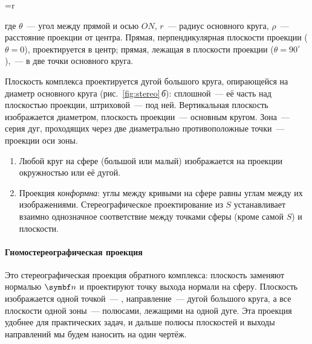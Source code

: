 \begin{keyeq}\label{eq:stereo-rho}
\rho=r\,\frac{}
\end{keyeq}
где $\theta$~— угол между прямой и осью $ON$, $r$~— радиус основного круга,
$\rho$~— расстояние проекции от центра. Прямая, перпендикулярная
плоскости проекции ($\theta=0$), проектируется в центр; прямая, лежащая в
плоскости проекции ($\theta=90^\circ$),~— в две точки основного круга.

Плоскость комплекса проектируется дугой большого круга, опирающейся на
диаметр основного круга (рис.~\ref{fig:stereo}\,\textit{б}): сплошной~— её
часть над плоскостью проекции, штриховой~— под ней. Вертикальная
плоскость изображается диаметром, плоскость проекции~— основным кругом.
Зона~— серия дуг, проходящих через две диаметрально противоположные
точки~— проекции оси зоны.

\begin{glavnoe}
\begin{enumerate}
\item Любой круг на сфере (большой или малый) изображается на проекции
окружностью или её дугой.
\item Проекция \emph{конформна}: углы между кривыми на сфере равны углам
между их изображениями. Стереографическое проектирование из $S$
устанавливает взаимно однозначное соответствие между точками сферы (кроме
самой $S$) и плоскости.
\end{enumerate}
\end{glavnoe}

\paragraph{Гномостереографическая проекция}
Это стереографическая проекция обратного комплекса: плоскость заменяют
нормалью $\vb n$ и проектируют точку выхода нормали на сферу. Плоскость
изображается одной точкой~— , направление~— дугой большого
круга, а все плоскости одной зоны~— полюсами, лежащими на одной дуге. Эта
проекция удобнее для практических задач, и дальше полюсы плоскостей и
выходы направлений мы будем наносить на один чертёж.

